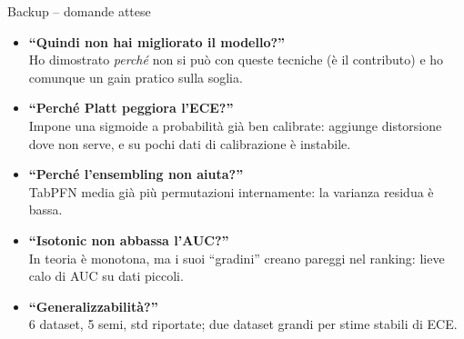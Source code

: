 \documentclass[11pt,aspectratio=169]{beamer}
\begin{document}
\begin{frame}{Backup -- domande attese}
\small
\begin{itemize}
  \item \textbf{``Quindi non hai migliorato il modello?''} \\
  Ho dimostrato \emph{perché} non si può con queste tecniche (è il contributo) e
  ho comunque un gain pratico sulla soglia.
  \item \textbf{``Perché Platt peggiora l'ECE?''} \\
  Impone una sigmoide a probabilità già ben calibrate: aggiunge distorsione dove
  non serve, e su pochi dati di calibrazione è instabile.
  \item \textbf{``Perché l'ensembling non aiuta?''} \\
  TabPFN media già più permutazioni internamente: la varianza residua è bassa.
  \item \textbf{``Isotonic non abbassa l'AUC?''} \\
  In teoria è monotona, ma i suoi ``gradini'' creano pareggi nel ranking: lieve
  calo di AUC su dati piccoli.
  \item \textbf{``Generalizzabilità?''} \\
  6 dataset, 5 semi, std riportate; due dataset grandi per stime stabili di ECE.
\end{itemize}
\end{frame}
\end{document}
